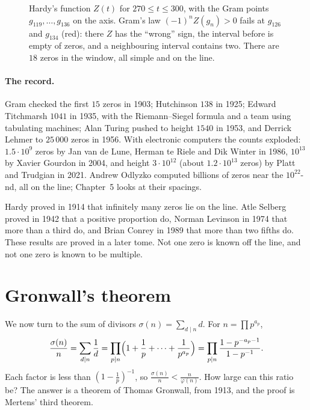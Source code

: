 \begin{figure}[ht]
\centering
{}
\caption{Hardy's function $Z(t)$ for $270\le t\le300$, with the Gram points $g_{119},\dots,g_{136}$ on the axis. Gram's law $(-1)^nZ(g_n)>0$ fails at
$g_{126}$ and $g_{134}$ (red): there $Z$ has the ``wrong'' sign, the interval before is empty of zeros, and a neighbouring interval contains two. There
are $18$ zeros in the window, all simple and on the line.}
\label{fig:gram}
\end{figure}

\paragraph{The record.} Gram checked the first $15$ zeros in 1903; Hutchinson $138$ in 1925; Edward Titchmarsh $1041$ in 1935, with the Riemann--Siegel
formula and a team using tabulating machines; Alan Turing pushed to height $1540$ in 1953, and Derrick Lehmer to $25\,000$ zeros in 1956. With
electronic computers the counts exploded: $1.5\cdot10^9$ zeros by Jan van de Lune, Herman te Riele and Dik Winter in 1986, $10^{13}$ by Xavier Gourdon in
2004, and height $3\cdot10^{12}$ (about $1.2\cdot10^{13}$ zeros) by Platt and Trudgian in 2021. Andrew Odlyzko computed billions of zeros near the
$10^{22}$-nd, all on the line; Chapter~5 looks at their spacings.

\begin{remark}\label{rem:hardy}
Hardy proved in 1914 that infinitely many zeros lie on the line. Atle Selberg proved in 1942 that a positive proportion do, Norman Levinson in 1974
that more than a third do, and Brian Conrey in 1989 that more than two fifths do. These results are proved in a later tome. Not one zero is known off the line,
and not one zero is known to be multiple.
\end{remark}

\section{Gronwall's theorem}

We now turn to the sum of divisors $\sigma(n)=\sum_{d\mid n}d$. For $n=\prod p^{a_p}$,
\[
\frac{\sigma(n)}n=\sum_{d\mid n}\frac1d=\prod_{p\mid n}\Bigl(1+\frac1p+\dots+\frac1{p^{a_p}}\Bigr)=\prod_{p\mid n}\frac{1-p^{-a_p-1}}{1-p^{-1}}.
\]
Each factor is less than $(1-\frac1p)^{-1}$, so $\frac{\sigma(n)}n<\frac n{\varphi(n)}$. How large can this ratio be? The answer is a theorem of Thomas
Gronwall, from 1913, and the proof is Mertens' third theorem.

